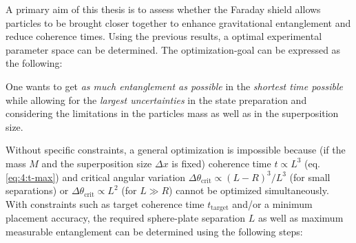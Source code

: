 A primary aim of this thesis is to assess whether the Faraday shield allows particles to be brought closer together to enhance gravitational entanglement and reduce coherence times. 
Using the previous results, a optimal experimental parameter space can be determined.
The optimization-goal can be expressed as the following:

One wants to get \textit{as much entanglement as possible} in the \textit{shortest time possible} while allowing for the \textit{largest uncertainties} in the state preparation and considering the limitations in the particles mass as well as in the superposition size.

Without specific constraints, a general optimization is impossible because (if the mass $M$ and the superposition size $\Delta x$ is fixed) coherence time $t \propto L^3$ (eq. \eqref{eq:4:t-max}) and critical angular variation $\Delta \theta_\mathrm{crit} \propto (L-R)^3/L^3$ (for small separations) or $\Delta \theta_\mathrm{crit} \propto L^2$ (for $L \gg R$) cannot be optimized simultaneously.
With constraints such as target coherence time $t_\mathrm{target}$ and/or a minimum placement accuracy, the required sphere-plate separation $L$ as well as maximum measurable entanglement can be determined using the following steps:
